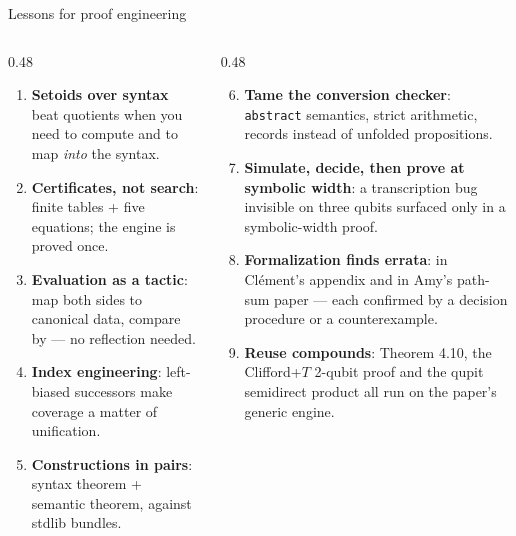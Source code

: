 \begin{frame}{Lessons for proof engineering \Mixed}
\begin{columns}[T]
\begin{column}{0.48\textwidth}
\begin{paperbox}[title=From the paper]
\small
\begin{enumerate}
  \setlength{\itemsep}{2pt}
  \item \textbf{Setoids over syntax} beat quotients when you need to compute and
        to map \emph{into} the syntax.
  \item \textbf{Certificates, not search}: finite tables + five equations;
        the engine is proved once.
  \item \textbf{Evaluation as a tactic}: map both sides to canonical data, compare by
         --- no reflection needed.
  \item \textbf{Index engineering}: left-biased successors make coverage a matter
        of unification.
  \item \textbf{Constructions in pairs}: syntax theorem + semantic theorem, against
        stdlib bundles.
\end{enumerate}
\end{paperbox}
\end{column}
\begin{column}{0.48\textwidth}
\begin{newdevbox}[title=Since]
\small
\begin{enumerate}
  \setcounter{enumi}{5}
  \setlength{\itemsep}{2pt}
  \item \textbf{Tame the conversion checker}: \texttt{abstract} semantics,
        strict arithmetic, records instead of unfolded propositions.
  \item \textbf{Simulate, decide, then prove at symbolic width}: a transcription
        bug invisible on three qubits surfaced only in a symbolic-width proof.
  \item \textbf{Formalization finds errata}: in Clément's appendix and in Amy's
        path-sum paper --- each confirmed by a decision procedure or a
        counterexample.
  \item \textbf{Reuse compounds}: Theorem 4.10, the Clifford+$T$ 2-qubit proof and
        the qupit semidirect product all run on the paper's generic engine.
\end{enumerate}
\end{newdevbox}
\end{column}
\end{columns}
\end{frame}

